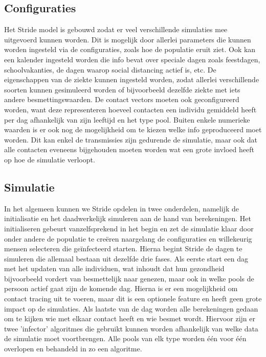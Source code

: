 \begin{appendices}
\subsection{Configuraties}
Het Stride model is gebouwd zodat er veel verschillende simulaties mee uitgevoerd kunnen worden. Dit is mogelijk door allerlei parameters die kunnen worden ingesteld via de configuraties, zoals hoe de populatie eruit ziet. Ook kan een kalender ingesteld worden die info bevat over speciale dagen zoals feestdagen, schoolvakanties, de dagen waarop social distancing actief is, etc. De eigenschappen van de ziekte kunnen ingesteld worden, zodat allerlei verschillende soorten kunnen gesimuleerd worden of bijvoorbeeld dezelfde ziekte met iets andere besmettingswaarden. De contact vectors moeten ook geconfigureerd worden, want deze representeren hoeveel contacten een individu gemiddeld heeft per dag afhankelijk van zijn leeftijd en het type pool. Buiten enkele numerieke waarden is er ook nog de mogelijkheid om te kiezen welke info geproduceerd moet worden. Dit kan enkel de transmissies zijn gedurende de simulatie, maar ook dat alle contacten eveneens bijgehouden moeten worden wat een grote invloed heeft op hoe de simulatie verloopt.

\subsection{Simulatie}
In het algemeen kunnen we Stride opdelen in twee onderdelen, namelijk de initialisatie en het daadwerkelijk simuleren aan de hand van berekeningen. Het initialiseren gebeurt vanzelfsprekend in het begin en zet de simulatie klaar door onder andere de populatie te creëren naargelang de configuraties en willekeurig mensen selecteren die geïnfecteerd starten. Hierna begint Stride de dagen te simuleren die allemaal bestaan uit dezelfde drie fases. Als eerste start een dag met het updaten van alle individuen, wat inhoudt dat hun gezondheid bijvoorbeeld vordert van besmettelijk naar genezen, maar ook in welke pools de persoon actief gaat zijn de komende dag. Hierna is er een mogelijkheid om contact tracing uit te voeren, maar dit is een optionele feature en heeft geen grote impact op de simulaties. Als laatste van de dag worden alle berekeningen gedaan om te kijken wie met elkaar contact heeft en wie besmet wordt. Hiervoor zijn er twee 'infector' algoritmes die gebruikt kunnen worden afhankelijk van welke data de simulatie moet voortbrengen. Alle pools van elk type worden één voor één overlopen en behandeld in zo een algoritme.


\end{appendices}
